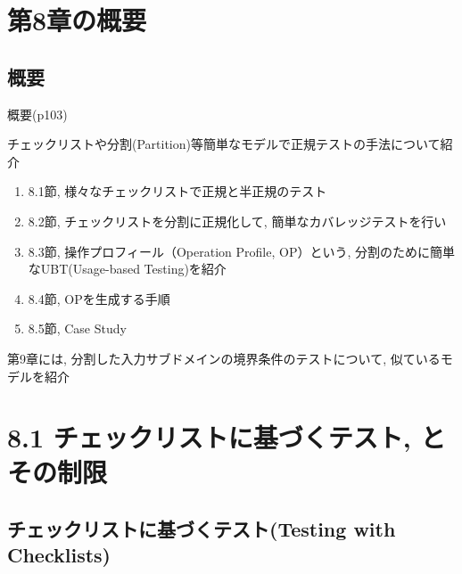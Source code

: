\section{第8章の概要}
\subsection{概要}
\begin{frame}{概要(p103)}


チェックリストや分割(Partition)等簡単なモデルで正規テストの手法について紹介

\begin{enumerate}
\item 8.1節, 様々なチェックリストで正規と半正規のテスト
\item 8.2節, チェックリストを分割に正規化して, 簡単なカバレッジテストを行い
\item 8.3節, 操作プロフィール（Operation Profile, OP）という,
    分割のために簡単なUBT(Usage-based Testing)を紹介
\item 8.4節, OPを生成する手順
\item 8.5節, Case Study
\end{enumerate}

第9章には, 分割した入力サブドメインの境界条件のテストについて, 似ているモデルを紹介

\end{frame}

\section{8.1 チェックリストに基づくテスト, とその制限}
\subsection{チェックリストに基づくテスト(Testing with Checklists)}

